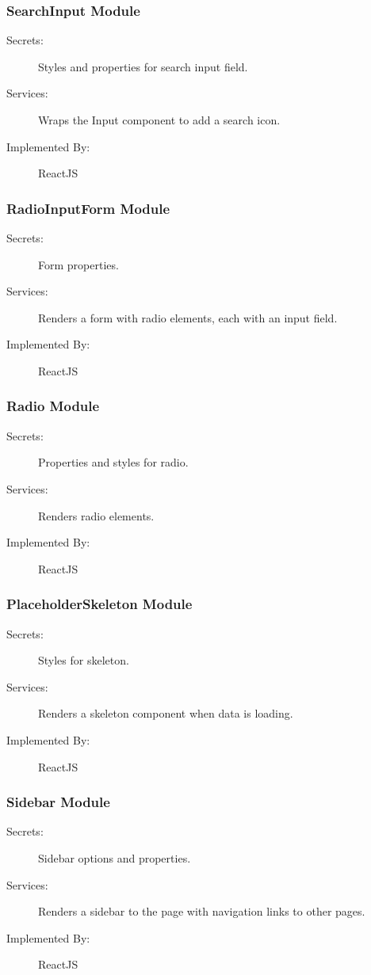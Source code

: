\documentclass[12pt, titlepage]{article}
\begin{document}
\subsubsection{SearchInput Module \label{mSearchInputModule}}
\begin{description}
\item[Secrets:]Styles and properties for search input field.
\item[Services:]Wraps the Input component to add a search icon.
\item[Implemented By:] ReactJS
\end{description}

\subsubsection{RadioInputForm Module \label{mRadioInputFormModule}}
\begin{description}
\item[Secrets:]Form properties.
\item[Services:]Renders a form with radio elements, each with an input field. 
\item[Implemented By:] ReactJS
\end{description}

\subsubsection{Radio Module \label{mRadioModule}}
\begin{description}
\item[Secrets:]Properties and styles for radio.
\item[Services:]Renders radio elements. 
\item[Implemented By:] ReactJS
\end{description}

\subsubsection{PlaceholderSkeleton Module \label{mPlaceholderSkeletonModule}}
\begin{description}
\item[Secrets:]Styles for skeleton.
\item[Services:]Renders a skeleton component when data is loading.
\item[Implemented By:] ReactJS
\end{description}

\subsubsection{Sidebar Module \label{mSidebarModule}}
\begin{description}
\item[Secrets:]Sidebar options and properties.
\item[Services:]Renders a sidebar to the page with navigation links to other pages.
\item[Implemented By:] ReactJS
\end{description}
\end{document}
